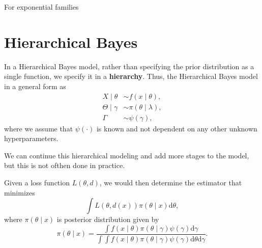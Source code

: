 For exponential families

\begin{theorem}{}{}

\end{theorem}

\section{Hierarchical Bayes}

In a Hierarchical Bayes model, rather than specifying the prior distribution as a single function, we specify it in a \textbf{hierarchy}. Thus, the Hierarchical Bayes model in a general form as
\begin{equation}
    \begin{aligned}
        X\mid\theta      & \sim f\left(x\mid\theta\right),         \\
        \Theta\mid\gamma & \sim \pi\left(\theta\mid\lambda\right), \\
        \Gamma           & \sim \psi\left(\gamma\right),
    \end{aligned}
    \label{eq:hierarchical-bayes}
\end{equation}
where we assume that $\psi\left(\cdot\right)$ is known and not dependent on any other unknown hyperparameters.

\begin{note}
    We can continue this hierarchical modeling and add more stages to the model, but this is not ofthen done in practice.
\end{note}

Given a loss function $L\left(\theta,d\right)$, we would then determine the estimator that minimizes
\begin{equation}
    \int L\left(\theta,d\left(x\right)\right)\pi\left(\theta\mid x\right)\mathrm{d}\theta,
    \label{eq:hierarchical-bayes-estimator}
\end{equation}
where $\pi\left(\theta\mid x\right)$ is posterior distribution given by
\begin{equation*}
    \pi\left(\theta\mid x\right)=\frac{\int f\left(x\mid\theta\right)\pi\left(\theta\mid\gamma\right)\psi\left(\gamma\right)\mathrm{d}\gamma}{\int\int f\left(x\mid\theta\right)\pi\left(\theta\mid\gamma\right)\psi\left(\gamma\right)\mathrm{d}\theta\mathrm{d}\gamma}.
\end{equation*}

